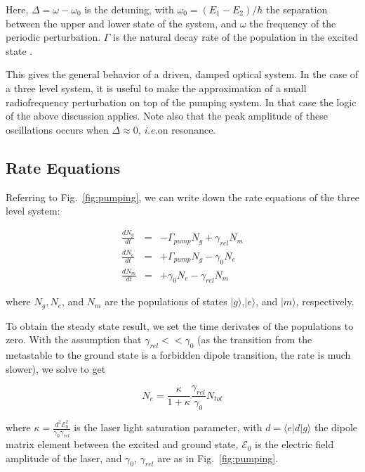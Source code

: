 Here, $\Delta = \omega - \omega_0$ is the detuning, with $\omega_0 =
(E_1 - E_2)/\hbar$ the separation between the upper and lower state of
the system, and $\omega$ the frequency of the periodic
perturbation. $\Gamma$ is the natural decay rate of the population in
the excited state \cite{budker}.

This gives the general behavior of a driven, damped optical system. In
the case of a three level system, it is useful to make the
approximation of a small radiofrequency perturbation on top of the pumping
system. In that case the logic of the above discussion applies. Note
also that the peak amplitude of these oscillations occurs when
$\Delta\approx0$, \emph{i.e.}on resonance.


\subsection{Rate Equations}\label{rateequations}

Referring to Fig.~\ref{fig:pumping}, we can write down the rate equations
of the three level system:

\begin{eqnarray}
\frac{dN_g}{dt} &=& -\Gamma_{pump}N_g + \gamma_{rel}N_m\\
\frac{dN_e}{dt} &=& +\Gamma_{pump}N_g - \gamma_{0}N_e\\
\frac{dN_m}{dt} &=& +\gamma_{0}N_e - \gamma_{rel}N_m
\end{eqnarray}

where $N_g, N_e$, and $N_m$ are the populations of states
$|g\rangle$,$|e\rangle$, and $|m\rangle$, respectively.

To obtain the steady state result, we set the time derivates of the
populations to zero. With the assumption that $\gamma_{rel}<<
\gamma_0$ (as the transition from the metastable to the ground state
is a forbidden dipole transition, the rate is much slower), we solve to get 

\begin{equation}
N_e = \frac{\kappa}{1+\kappa}\frac{\gamma_{rel}}{\gamma_{0}}N_{tot}
\end{equation}

where $\kappa = \frac{d^2\mathcal{E}_0^2}{\gamma_0\gamma_{rel}}$ is
the laser light saturation parameter, with $d = \langle e|d|g\rangle$
the dipole matrix element between the excited and ground state,
$\mathcal{E}_0$ is the electric field amplitude of the laser, and
$\gamma_0$, $\gamma_{rel}$ are as in Fig.~\ref{fig:pumping}.

